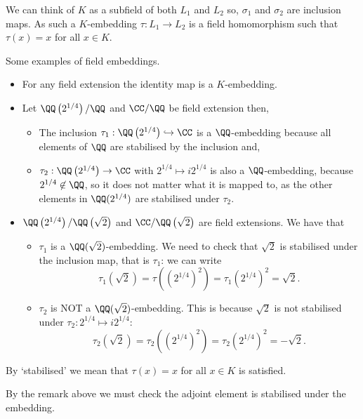 \documentclass[12pt, a4paper]{article}
\begin{document}
\begin{mdremark}
    We can think of \(K\) as a subfield of both \(L_1\) and \(L_2\) so, \(\sigma_1\) and \(\sigma_2\) are inclusion maps. As such a \(K\)-embedding \(\tau:L_1\to L_2\) is a field homomorphism such that \(\tau(x)=x\) for all \(x\in K\).
\end{mdremark}

\begin{mdexample}
    Some examples of field embeddings.
    \begin{itemize}
        \item For any field extension the identity map is a \(K\)-embedding.
        \item Let \(\QQ\left( 2^{1/4} \right)/\QQ\) and \(\CC/\QQ\) be field extension then,
        \begin{itemize}
            \item The inclusion \(\tau_1 :\QQ\left( 2^{1/4} \right) \hookrightarrow \CC\) is a \(\QQ\)-embedding because all elements of \(\QQ\) are stabilised by the inclusion and,
            \item \(\tau_2 :\QQ\left( 2^{1/4} \right)\to \CC\) with \(2^{1/4} \mapsto i 2^{1/4}\) is also a \(\QQ\)-embedding, because \(2^{1/4} \not\in \QQ\), so it does not matter what it is mapped to, as the other elements in \(\QQ(2^{1/4})\) are stabilised under \(\tau_2\).
        \end{itemize}
        \item \(\QQ\left( 2^{1/4} \right)/\QQ\left( \sqrt{2} \right)\) and \(\CC/\QQ\left( \sqrt{2} \right)\) are field extensions. We have that 
        \begin{itemize}
            \item \(\tau_1\) is a \(\QQ(\sqrt{2})\)-embedding. We need to check that \(\sqrt{2}\) is stabilised under the inclusion map, that is \(\tau_1\): we can write  
            \[\tau_1(\sqrt{2})=\tau((2^{1/4})^2)=\tau_1( 2^{1/4} )^2 = \sqrt{2}.\]
            \item \(\tau_2\) is NOT a \(\QQ(\sqrt{2})\)-embedding. This is because \(\sqrt{2}\) is not stabilised under \(\tau_2 : 2^{1/4}\mapsto i2^{1/4}\):
            \[\tau_2(\sqrt{2})=\tau_2((2^{1/4})^2)=\tau_2(2^{1/4})^2=-\sqrt{2}.\]
        \end{itemize}
    \end{itemize}
\end{mdexample}

\begin{mdnote}
    By `stabilised' we mean that \(\tau(x)=x\) for all \(x\in K\) is satisfied.

    By the remark above we must check the adjoint element is stabilised under the embedding.
\end{mdnote}
\end{document}
